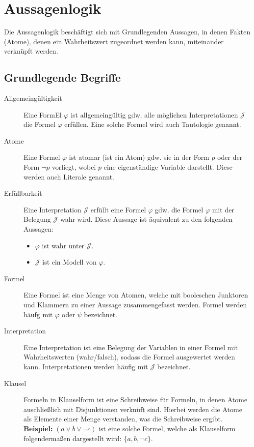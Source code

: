 \chapter{Aussagenlogik}
	Die Aussagenlogik beschäftigt sich mit Grundlegenden Aussagen, in denen Fakten (Atome), denen ein Wahrheitswert zugeordnet werden kann, miteinander verknüpft werden.

	\section{Grundlegende Begriffe}
		\begin{description}
			\item[Allgemeingültigkeit] Eine FormEl $ \varphi $ ist allgemeingültig gdw. alle möglichen Interpretationen $ \mathcal{J} $ die Formel $ \varphi $ erfüllen. Eine solche Formel wird auch Tautologie genannt.
			\item[Atome] Eine Formel $ \varphi $ ist atomar (ist ein Atom) gdw. sie in der Form $ p $ oder der Form $ \lnot p $ vorliegt, wobei $ p $ eine eigenständige Variable darstellt. Diese werden auch Literale genannt.
			\item[Erfüllbarkeit] Eine Interpretation $ \mathcal{J} $ erfüllt eine Formel $ \varphi $ gdw. die Formel $ \varphi $ mit der Belegung $ \mathcal{J} $ wahr wird. Diese Aussage ist äquivalent zu den folgenden Aussagen:
				\begin{itemize}
					\item $ \varphi $ ist wahr unter $ \mathcal{J} $.
					\item $ \mathcal{J} $ ist ein Modell von $ \varphi $.
				\end{itemize}
			\item[Formel] Eine Formel ist eine Menge von Atomen, welche mit booleschen Junktoren und Klammern zu einer Aussage zusammengefasst werden. Formel werden häufg mit $ \varphi $ oder $ \psi $ bezeichnet.
			\item[Interpretation] Eine Interpretation ist eine Belegung der Variablen in einer Formel mit Wahrheitswerten (wahr/falsch), sodass die Formel ausgewertet werden kann. Interpretationen werden häufig mit $ \mathcal{J} $ bezeichnet.
			\item[Klausel] Formeln in Klauselform ist eine Schreibweise für Formeln, in denen Atome auschließlich mit Disjunktionen verknüft sind. Hierbei werden die Atome als Elemente einer Menge verstanden, was die Schreibweise ergibt. \\ \textbf{Beispiel:} $ (a \lor b \lor \lnot c) $ ist eine solche Formel, welche als Klauselform folgendermaßen dargestellt wird: $ \{ a, b, \lnot c \} $.

\end{description}
